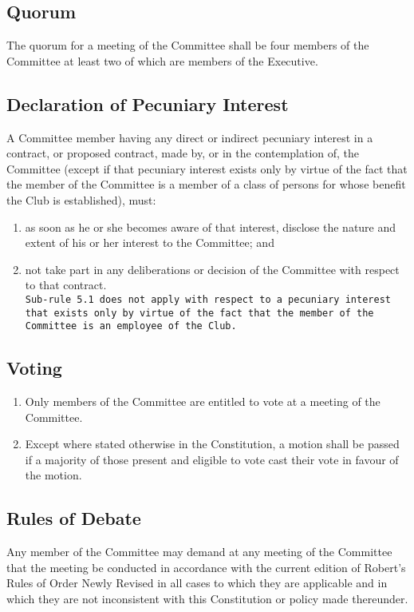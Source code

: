 \documentclass[11pt]{article} %
\begin{document}
\subsection{Quorum}
The quorum for a meeting of the Committee shall be four members of the Committee at least two of which are members of the Executive.
\subsection{Declaration of Pecuniary Interest}
A Committee member having any direct or indirect pecuniary interest in a contract, or proposed contract, made by, or in the contemplation of, the Committee (except if that pecuniary interest exists only by virtue of the fact that the member of the Committee is a member of a class of persons for whose benefit the Club is established), must:
\begin{enumerate}
\item as soon as he or she becomes aware of that interest, disclose the nature and extent of his or her interest to the Committee; and
\item not take part in any deliberations or decision of the Committee with respect to that contract.\\
\texttt{Sub-rule 5.1 does not apply with respect to a pecuniary interest that exists only by virtue of the fact that the member of the Committee is an employee of the Club.}
\end{enumerate}
\subsection{Voting}
\begin{enumerate}
\item Only members of the Committee are entitled to vote at a meeting of the Committee.
\item Except where stated otherwise in the Constitution, a motion shall be passed if a majority of those present and eligible to vote cast their vote in favour of the motion.
\end{enumerate}
\subsection{Rules of Debate}
Any member of the Committee may demand at any meeting of the Committee that the meeting be conducted in accordance with the current edition of Robert’s Rules of Order Newly Revised in all cases to which they are applicable and in which they are not inconsistent with this Constitution or policy made thereunder.
\end{document}
